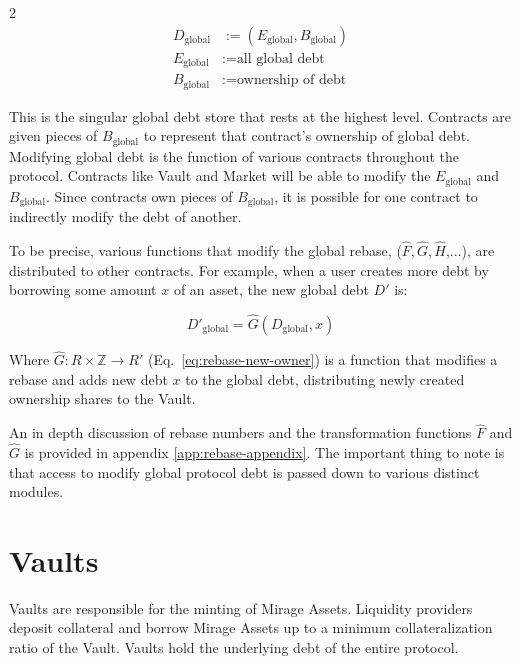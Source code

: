 \documentclass[letterpaper]{article}
\begin{document}
\begin{multicols}{2}
\begin{align}
    D_{\text{global}} &:= (E_{\text{global}}, B_{\text{global}}) \\
    E_{\text{global}} &:= \text{all global debt} \\
    B_{\text{global}} &:= \text{ownership of debt}
\end{align}

This is the singular global debt store that rests at the highest level. Contracts are given pieces of $B_{\text{global}}$ to represent that contract's ownership of global debt. Modifying global debt is the function of various contracts throughout the protocol. Contracts like Vault and Market will be able to modify the $E_{\text{global}}$ and $B_{\text{global}}$. Since contracts own pieces of $B_{\text{global}}$, it is possible for one contract to indirectly modify the debt of another.

To be precise, various functions that modify the global rebase, ($\hat{F}, \hat{G}, \hat{H}$,...), are distributed to other contracts. For example, when a user creates more debt by borrowing some amount $x$ of an asset, the new global debt $D'$ is:

\begin{equation}
    \label{eq:add-debt}
    D'_{\text{global}} = \hat{G}(D_{\text{global}}, x)
\end{equation}

Where $\hat{G}: R \times \mathbb{Z} \rightarrow R'$ (Eq.~\ref{eq:rebase-new-owner}) is a function that modifies a rebase and adds new debt $x$ to the global debt, distributing newly created ownership shares to the Vault.

An in depth discussion of rebase numbers and the transformation functions $\hat{F}$ and $\hat{G}$ is provided in appendix \ref{app:rebase-appendix}. The important thing to note is that access to modify global protocol debt is passed down to various distinct modules.






\section{Vaults}
\label{sec:vaults}

Vaults are responsible for the minting of Mirage Assets. Liquidity providers deposit collateral and borrow Mirage Assets up to a minimum collateralization ratio of the Vault. Vaults hold the underlying debt of the entire protocol.


\end{multicols}
\end{document}
